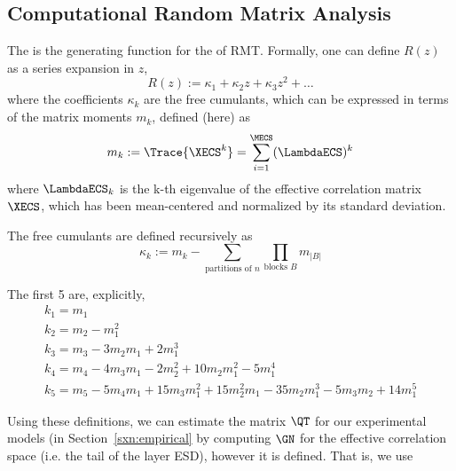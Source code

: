 \subsection{Computational Random Matrix Analysis}
\label{sxn:comp_rmt}
The \RTransform is the generating function for the \emph{\FreeCumulants} of RMT.  Formally, one can define $R(z)$ as a series expansion in $z$,
\begin{equation}
  \label{eqn:Rz_expansion}
  R(z) := \kappa_1 + \kappa_2 z + \kappa_3 z^2 + \ldots 
\end{equation}
where the coefficients $\kappa_{k}$ are the free cumulants, which can be expressed
in terms of the matrix moments $m_{k}$\cite{FreeCumulants}, defined (here) as
\begin{equation}
  \label{eqn:mk_defn}
  m_{k}:=\Trace{\XECS^{k}}=\sum_{i=1}^{\MECS}(\LambdaECS)^{k}
\end{equation}
where $\LambdaECS_{k}$ is the k-th eigenvalue of the effective correlation matrix $\mathbf\XECS$,
which  has been mean-centered and normalized by its standard deviation.

The free cumulants are defined recursively as
\begin{equation}
  \label{eqn:kappa_defn}
  \kappa_k := m_k - \sum_{\text{partitions of } n} \prod_{\text{blocks } B} m_{|B|} 
\end{equation}

The first 5 \emph{\Cumulants} are, explicitly,
\begin{align}
  \label{eqn:kappa_defn_2}
  k_1 = m_1 \\ \nonumber
  k_2 = m_2 - m_1^2 \\ \nonumber
  k_3 = m_3 - 3 m_2 m_1 + 2 m_1^3 \\ \nonumber
  k_4 = m_4 - 4 m_3 m_1 - 2 m_2^2 + 10 m_2 m_1^2 - 5 m_1^4 \\ \nonumber 
  k_5 = m_5 - 5 m_4 m_1 + 15 m_3 m_1^2 + 15 m_2^2 m_1 - 35 m_2 m_1^3 - 5 m_3 m_2 + 14 m_1^5
\end{align}

Using these definitions, we can estimate the \LayerQuality matrix $\QT$ for our experimental models
(in Section~\ref{sxn:empirical} by computing  $\GN$ for the effective correlation space
(i.e. the tail of the layer ESD), however it is defined.  That is, we use

